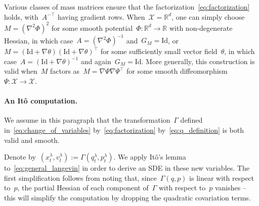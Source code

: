 \documentclass[10pt]{article}
\newcommand{\R}{\mathbb{R}}
\newcommand{\cX}{\mathcal{X}}
\newcommand{\1}{\mathbbm 1}
\newcommand{\Id}{\mathrm{Id}}
\begin{document}
Various classes of mass matrices ensure that the factorization~\eqref{eq:factorization} holds, with~$A^{-\top}$ having gradient rows. When~$\cX=\R^d$, one can simply choose~$M=(\nabla^2 \Phi)^2$ for some smooth potential~$\Phi:\R^d\to\R$ with non-degenerate Hessian, in which case~$A=(\nabla^2 \Phi)^{-1}$ and~$G_M=\Id$, or~$M = (\Id + \nabla\theta)(\Id+\nabla\theta)^\top$ for some sufficiently small vector field~$\theta$, in which case~$A = (\Id+\nabla\theta)^{-1}$ and again~$G_M=\Id$.
More generally, this construction is valid when~$M$ factors as~$M=\nabla\Psi\nabla\Psi^\top$ for some smooth diffeomorphism~$\Psi:\cX\to\cX$.

\paragraph{An It\^o computation.}
We assume in this paragraph that the transformation~$\Gamma$ defined in~\eqref{eq:change_of_variables} by~\eqref{eq:factorization} by~\eqref{eq:q_definition} is both valid and smooth.

Denote by~$(x_t^\lambda,v_t^\lambda) := \Gamma(q_t^\lambda,p_t^\lambda)$. We apply It\^o's lemma to~\eqref{eq:general_langevin} in order to derive an SDE in these new variables.
The first simplification follows from noting that, since~$\Gamma(q,p)$ is linear with respect to~$p$, the partial Hessian of each component of~$\Gamma$ with respect to~$p$ vanishes -- this will simplify the computation by dropping the quadratic covariation terms.
\end{document}
